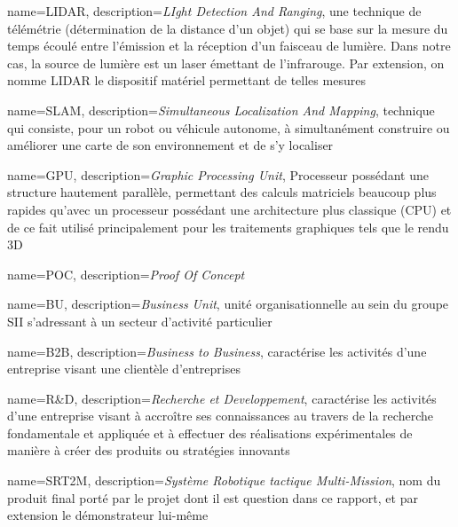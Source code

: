 \makeglossaries

{
	name={LIDAR},
	description={\emph{LIght Detection And Ranging}, une technique de télémétrie (détermination de la distance d'un objet) qui se base sur la mesure du temps écoulé entre l'émission et la réception d'un faisceau de lumière. Dans notre cas, la source de lumière est un laser émettant de l'infrarouge. Par extension, on nomme LIDAR le dispositif matériel permettant de telles mesures}
}

{
	name={SLAM},
	description={\emph{Simultaneous Localization And Mapping}, technique qui consiste, pour un robot ou véhicule autonome, à simultanément construire ou améliorer une carte de son environnement et de s’y localiser}
}

{
	name={GPU},
	description={\emph{Graphic Processing Unit}, Processeur possédant une structure hautement parallèle, permettant des calculs matriciels beaucoup plus rapides qu'avec un processeur possédant une architecture plus classique (CPU) et de ce fait utilisé principalement pour les traitements graphiques tels que le rendu 3D}
}

{
	name={POC},
	description={\emph{Proof Of Concept}}
}

{
	name={BU},
	description={\emph{Business Unit}, unité organisationnelle au sein du groupe SII s'adressant à un secteur d'activité particulier}
}

{
	name={B2B},
	description={\emph{Business to Business}, caractérise les activités d'une entreprise visant une clientèle d'entreprises}
}

{
	name={R\&D},
	description={\emph{Recherche et Developpement}, caractérise les activités d'une entreprise visant à accroître ses connaissances au travers de la recherche fondamentale et appliquée et à effectuer des réalisations expérimentales de manière à créer des produits ou stratégies innovants}
}

{
	name={SRT2M},
	description={\emph{Système Robotique tactique Multi-Mission}, nom du produit final porté par le projet dont il est question dans ce rapport, et par extension le démonstrateur lui-même}
}
